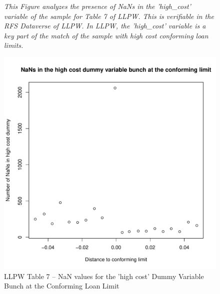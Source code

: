 \documentclass{article}
\begin{document}
\clearpage
\pagebreak

\begin{figure}
    
\caption{LLPW Table 7 -- NaN values for the 'high cost' Dummy Variable Bunch at the Conforming Loan Limit}

\emph{This Figure analyzes the presence of NaNs in the 'high\_cost' variable of the sample for Table 7 of LLPW. This is verifiable in the RFS Dataverse of LLPW. In LLPW, the 'high\_cost' variable is a key part of the match of the sample with high cost conforming loan limits.}

\begin{center}
\includegraphics[scale = 0.5]{02_evidence_of_data_errors_in_LPW_2024_Table_7/figures/nans_in_high_cost_dummy_bunching.pdf}
\end{center}

\end{figure}

\clearpage
\pagebreak
\end{document}
